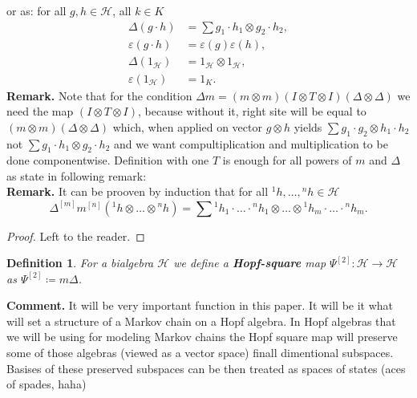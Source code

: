 \documentclass[a4paper, 12pt]{report}
\newtheorem{definition}{Definition}
\begin{document}
or as: for all $g, h \in \mathcal{H}$, all $k \in K$
\begin{align*}
\Delta(g \cdot h) &= \sum g_1 \cdot h_1 \otimes g_2 \cdot h_2, \\
\varepsilon(g \cdot h) &= \varepsilon(g)\varepsilon(h), \\
\Delta (1_\mathcal{H}) &= 1_\mathcal{H} \otimes 1_\mathcal{H}, \\
\varepsilon (1_\mathcal{H}) &= 1_K.
\end{align*}
\textbf{Remark. } Note that for the condition
$\Delta m = (m\otimes m)(I \otimes T \otimes I)(\Delta \otimes \Delta)$
we need the map $(I \otimes T \otimes I)$, because without it, right site will be equal to
$(m \otimes m)(\Delta \otimes \Delta)$ which, when applied on vector $g \otimes h$ yields
$\displaystyle\sum g_1 \cdot g_2 \otimes h_1 \cdot h_2$ not $\sum g_1 \cdot h_1 \otimes g_2 \cdot h_2$
and we want compultiplication and multiplication to be done componentwise. Definition with
one $T$ is enough for all powers of $m$ and $\Delta$ as state in following remark:\\
\textbf{Remark. } It can be prooven by induction that for all ${^1h}, \dots, {^nh} \in \mathcal{H}$
\begin{equation}
\Delta^{[m]}m^{[n]}({^1h} \otimes \dots \otimes {^nh}) = \sum {^1h}_1 \cdot \ldots \cdot {^nh}_1
\otimes \dots \otimes {^1h}_m\cdot  \ldots \cdot {^nh}_m.
\end{equation}
\begin{proof}
Left to the reader.
\end{proof}
\begin{definition}
For a bialgebra $\mathcal{H}$ we define a \textbf{Hopf-square} map
$\Psi^{[2]} : \mathcal{H} \to \mathcal{H}$ as $\Psi^{[2]} \coloneqq m\Delta$.
\end{definition}
\textbf{Comment. } It will be very important function in this paper. It will be it what will set a structure
of a Markov chain on a Hopf algebra. In Hopf algebras that we will
be using for modeling Markov chains the Hopf square map will preserve some of those algebras
(viewed as a vector space) finall dimentional subspaces. Basises of these preserved
subspaces can be then treated as spaces of states (aces of spades, haha)
\end{document}
